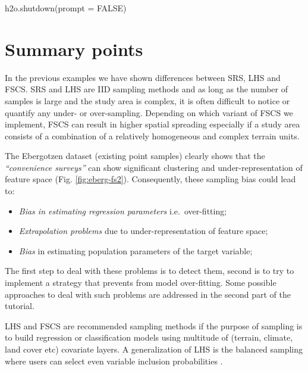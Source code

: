 \documentclass[
  graybox,natbib,nospthms]{svmono}
\newenvironment{Shaded}{\begin{snugshade}}{\end{snugshade}}
\newcommand{\AttributeTok}[1]{\textcolor[rgb]{0.61,0.61,0.61}{#1}}
\newcommand{\ConstantTok}[1]{\textcolor[rgb]{0,0,0}{#1}}
\newcommand{\FunctionTok}[1]{\textcolor[rgb]{0,0,0}{#1}}
\newcommand{\NormalTok}[1]{#1}
\providecommand{\tightlist}{%
  \setlength{\itemsep}{0pt}\setlength{\parskip}{0pt}}
\providecommand{\tightlist}{\setlength{\itemsep}{0pt}\setlength{\parskip}{0pt}}
\begin{document}
\begin{Shaded}
\begin{Highlighting}[]
\FunctionTok{h2o.shutdown}\NormalTok{(}\AttributeTok{prompt =} \ConstantTok{FALSE}\NormalTok{)}
\end{Highlighting}
\end{Shaded}

\hypertarget{summary-points}{%
\section{Summary points}\label{summary-points}}

In the previous examples we have shown differences between SRS, LHS and FSCS.
SRS and LHS are IID sampling methods and as long as the number of samples is large
and the study area is complex, it is often difficult to notice or quantify any under- or
over-sampling. Depending on which variant of FSCS we implement, FSCS can result in
higher spatial spreading especially if a study area consists of a combination
of a relatively homogeneous and complex terrain units.

The Ebergotzen dataset (existing point samples) clearly shows that the \emph{``convenience surveys''} can
show significant clustering and under-representation of feature space
(Fig. \ref{fig:eberg-fs2}). Consequently, these sampling bias could lead to:

\begin{itemize}
\tightlist
\item
  \emph{Bias in estimating regression parameters} i.e.~over-fitting;\\
\item
  \emph{Extrapolation problems} due to under-representation of feature space;\\
\item
  \emph{Bias} in estimating population parameters of the target variable;
\end{itemize}

The first step to deal with these problems is to detect them, second is to try
to implement a strategy that prevents from model over-fitting. Some possible approaches
to deal with such problems are addressed in the second part of the tutorial.

LHS and FSCS are recommended sampling methods if the purpose of sampling is to
build regression or classification models using multitude of (terrain,
climate, land cover etc) covariate layers. A generalization of LHS is the balanced
sampling where users can select even variable inclusion probabilities \citep{grafstrom2014efficient, brus2015balanced}.
\end{document}
